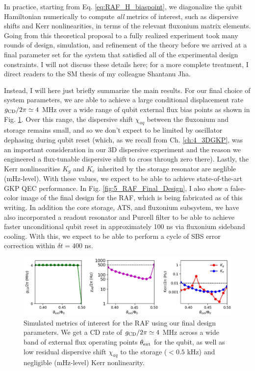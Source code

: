 In practice, starting from Eq. \eqref{eq:RAF_H_biaspoint}, we diagonalize the qubit Hamiltonian numerically to compute \textit{all} metrics of interest, such as dispersive shifts and Kerr nonlinearities, in terms of the relevant fluxonium matrix elements. Going from this theoretical proposal to a fully realized experiment took many rounds of design, simulation, and refinement of the theory before we arrived at a final parameter set for the system that satisfied all of the experimental design constraints. I will not discuss these details here; for a more complete treatment, I direct readers to the SM thesis of my colleague Shantanu Jha. 

Instead, I will here just briefly summarize the main results. For our final choice of system parameters, we are able to achieve a large conditional displacement rate $g_{\rm CD}/2\pi \simeq 4$ MHz over a wide range of qubit external flux bias points as shown in Fig. \ref{fig:5_RAF_Metrics}. Over this range, the dispersive shift $\chi_{aq}$ between the fluxonium and storage remains small, and so we don't expect to be limited by oscillator dephasing during qubit reset (which, as we recall from Ch. \ref{ch:4_3DGKP}, was an important consideration in our 3D dispersive experiment and the reason we engineered a flux-tunable dispersive shift to cross through zero there). Lastly, the Kerr nonlinearities $K_g$ and $K_e$ inherited by the storage resonator are neglible (mHz-level). With these values, we expect to be able to achieve state-of-the-art GKP QEC performance. In Fig. \ref{fig:5_RAF_Final_Design}, I also show a false-color image of the final design for the RAF, which is being fabricated as of this writing. In addition the core storage, ATS, and fluxonium subsystem, we have also incorporated a readout resonator and Purcell filter to be able to achieve faster unconditional qubit reset in approximately 100 ns via fluxonium sideband cooling. With this, we expect to be able to perform a cycle of SBS error correction within $\delta t = 400$ ns. 

\begin{figure}[h]
    \centering
    \includegraphics[width=0.95\linewidth]{Figures/5/RAF_Metrics.pdf}
    \caption{Simulated metrics of interest for the RAF using our final design parameters. We get a CD rate of $g_{\rm CD}/2\pi \simeq 4$ MHz across a wide band of external flux operating points $\theta_{\rm ext}$ for the qubit, as well as low residual dispersive shift $\chi_{aq}$ to the storage ($< 0.5$ kHz) and negligible (mHz-level) Kerr nonlinearity.}
    \label{fig:5_RAF_Metrics}
\end{figure}


